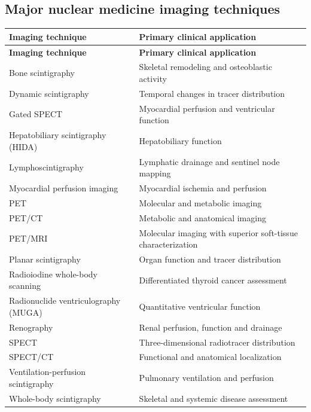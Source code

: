 \subsection{Major nuclear medicine imaging techniques}
\begin{longtable}{@{}p{}p{}@{}}
\toprule
\textbf{Imaging technique} & \textbf{Primary clinical application} \\
\midrule
\endfirsthead
\toprule
\textbf{Imaging technique} & \textbf{Primary clinical application} \\
\midrule
\endhead
Bone scintigraphy & Skeletal remodeling and osteoblastic activity \\
Dynamic scintigraphy & Temporal changes in tracer distribution \\
Gated SPECT & Myocardial perfusion and ventricular function \\
Hepatobiliary scintigraphy (HIDA) & Hepatobiliary function \\
Lymphoscintigraphy & Lymphatic drainage and sentinel node mapping \\
Myocardial perfusion imaging & Myocardial ischemia and perfusion \\
PET & Molecular and metabolic imaging \\
PET/CT & Metabolic and anatomical imaging \\
PET/MRI & Molecular imaging with superior soft-tissue characterization \\
Planar scintigraphy & Organ function and tracer distribution \\
Radioiodine whole-body scanning & Differentiated thyroid cancer assessment \\
Radionuclide ventriculography (MUGA) & Quantitative ventricular function \\
Renography & Renal perfusion, function and drainage \\
SPECT & Three-dimensional radiotracer distribution \\
SPECT/CT & Functional and anatomical localization \\
Ventilation-perfusion scintigraphy & Pulmonary ventilation and perfusion \\
Whole-body scintigraphy & Skeletal and systemic disease assessment \\
\bottomrule
\end{longtable}

